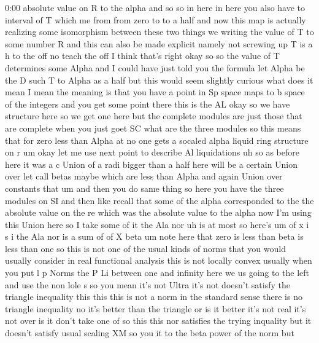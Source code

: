\begin{unfinished}{0:00}
absolute  value  on  R  to  the
alpha  and
so  so  in
here  in  here  you  also  have  to  interval
of  T  which  me  from  from  zero  to  to  a
half
and  now  this  map  is  actually  realizing
some  isomorphism  between  these  two
things  we  writing  the  value  of  T  to  some
number  R  and  this  can  also  be  made
explicit  namely  not  screwing  up  T  is  a  h
to  the
off  no  teach  the
off  I  think  that's  right
okay  so  so  the  value  of  T  determines
some  Alpha  and  I  could  have  just  told
you  the  formula  let  Alpha  be  the  D  such
T  to  Alpha  as  a  half  but  this  would  seem
slightly  curious  what  does  it  mean  I
mean  the  meaning  is  that  you  have  a
point  in  Sp  space  maps  to  b  space  of  the
integers  and  you  get  some  point  there
this  is  the
AL  okay  so  we  have  structure  here  so  we
get  one  here  but  the  complete  modules
are  just  those  that  are  complete  when
you  just  goet  SC
what  are  the  three
modules  so  this  means  that  for  zero  less
than  Alpha  at  no
one  gets  a
socaled  alpha  liquid  ring  structure  on
r
um  okay  let  me  use  next  point  to
describe
Al
liquidations  uh  so  as  before  here  it  was
a  c  Union  of  a  radi  bigger  than  a  half
here  will  be  a  certain  Union  over  let
call  betas  maybe  which  are  less  than
Alpha
and  again  Union  over
constants  that
um  and  then  you  do  same  thing  so  here
you
have  the  three  modules  on  SI  and
then  like  recall  that  some  of  the  alpha
corresponded  to  the  the  absolute  value
on  the  re  which  was  the  absolute  value
to  the  alpha  now  I'm  using  this  Union
here  so  I  take  some  of
it  the  Ala  nor
uh  is  at
most  so  here's
um  of  x  i  s
i  the  Ala  nor  is  a  sum  of  of  X
beta  um  note  here  that  zero  is  less  than
beta  is  less  than  one  so  this  is  not  one
of  the  usual  kinds  of  norms  that  you
would  usually  consider  in  real
functional  analysis  this  is  not  locally
convex  usually  when  you  put  l  p  Norms
the  P  Li  between  one  and  infinity  here
we  us  going  to  the  left  and  use  the  non
lole
s  so  you  mean  it's  not  Ultra  it's  not
doesn't  satisfy  the  triangle  inequality
this  this  this  is  not  a  norm  in  the
standard  sense  there  is  no  triangle
inequality  no  it's  better  than  the
triangle  or  is  it
better  it's  not  real  it's  not  over  is
it  don't  take  one
of  so  this  this  nor  satisfies  the  trying
inquality  but  it  doesn't  satisfy  usual
scaling  XM  so  you
it  to  the  beta  power  of  the  norm  but

\end{unfinished}
